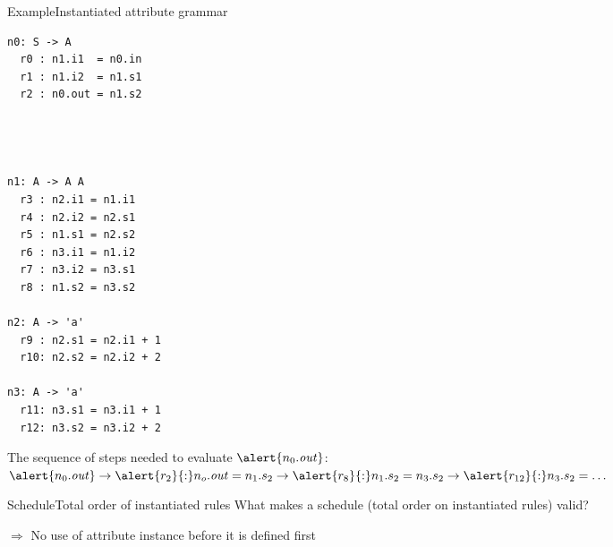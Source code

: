 \begin{frame}[fragile=singleslide]{Example}{Instantiated attribute grammar}


\begin{multicols}{3}
\begin{Verbatim}[fontsize=\scriptsize]
n0: S -> A
  r0 : n1.i1  = n0.in
  r1 : n1.i2  = n1.s1
  r2 : n0.out = n1.s2




n1: A -> A A
  r3 : n2.i1 = n1.i1
  r4 : n2.i2 = n2.s1
  r5 : n1.s1 = n2.s2
  r6 : n3.i1 = n1.i2
  r7 : n3.i2 = n3.s1
  r8 : n1.s2 = n3.s2

n2: A -> 'a'
  r9 : n2.s1 = n2.i1 + 1
  r10: n2.s2 = n2.i2 + 2
    
n3: A -> 'a'
  r11: n3.s1 = n3.i1 + 1
  r12: n3.s2 = n3.i2 + 2
\end{Verbatim}
\end{multicols}

The sequence of steps needed to evaluate $\alert{n_0.\mathit{out}}$:
$\alert{n_0.\mathit{out}} \to \alert{r_2}{:} n_o.\mathit{out} = n_1.s_2 \to \alert{r_8}{:} n_1.s_2 = n_3.s_2 \to \alert{r_{12}}{:}n_3.s_2 = \dots$

\end{frame}


\begin{frame}{Schedule}{Total order of instantiated rules}
What makes a schedule (total order on instantiated rules) valid?

\newlinevspace

$\Rightarrow$ \alert{No use of attribute instance before it is defined first}

\end{frame}

